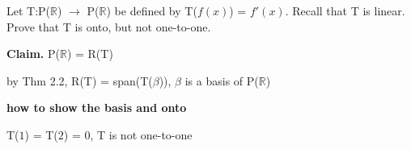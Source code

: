 Let T:P($\mathbb{R}$) $\rightarrow$ P($\mathbb{R}$) be defined by T($f(x)$) = $f'(x)$. Recall that T is linear. Prove that T is onto, but not one-to-one.

\begin{tcolorbox}
\begin{solution}
	\textbf{Claim.} P($\mathbb{R}$) = R(T)
	
	by Thm 2.2, R(T) = span(T($\beta$)), $\beta$ is a basis of P($\mathbb{R}$)

	\textbf{\color{red}how to show the basis and onto}
	
	T($1$) = T($2$) = $0$, T is not one-to-one
\end{solution}

\end{tcolorbox}